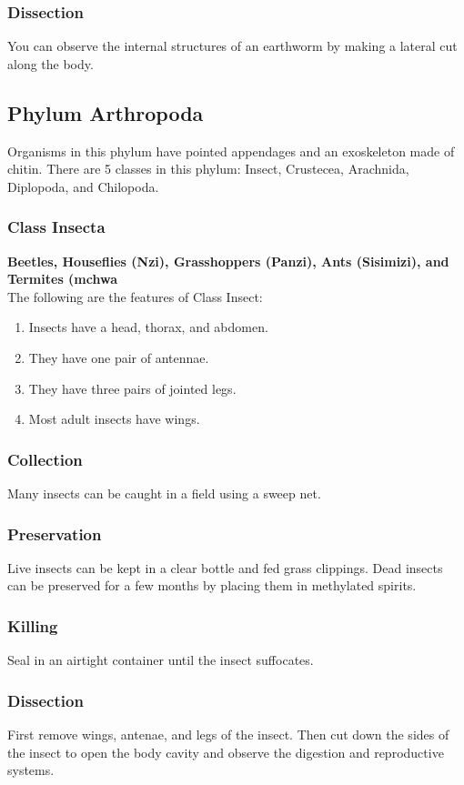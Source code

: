 \subsubsection{Dissection}
You can observe the internal structures of an earthworm by making a lateral cut along the body.

\subsection{Phylum Arthropoda}
Organisms in this phylum have pointed appendages and an exoskeleton made of chitin. There are 5 classes in this phylum: Insect, Crustecea, Arachnida, Diplopoda, and Chilopoda.

\subsubsection{Class Insecta}

\textbf{Beetles, Houseflies (Nzi), Grasshoppers (Panzi), Ants (Sisimizi), and Termites (mchwa}\\
The following are the features of Class Insect:
\begin{enumerate}
\item{Insects have a head, thorax, and abdomen.}
\item{They have one pair of antennae.}
\item{They have three pairs of jointed legs.}
\item{Most adult insects have wings.}
\end{enumerate}

\subsubsection{Collection}
Many insects can be caught in a field using a sweep net. 

\subsubsection{Preservation} 
Live insects can be kept in a clear bottle and fed grass clippings. Dead insects can be preserved for a few months by placing them in methylated spirits.

\subsubsection{Killing}
Seal in an airtight container until the insect suffocates.

\subsubsection{Dissection}
First remove wings, antenae, and legs of the insect. Then cut down the sides of the insect to open the body cavity and observe the digestion and reproductive systems.
	
